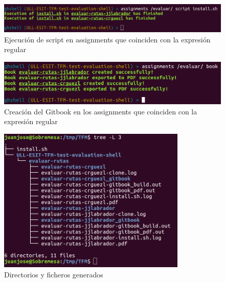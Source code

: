 \begin{itemize}
		\begin{figure}[H]
		\begin{center}
		\includegraphics[width=1\textwidth]{images/assignments1-2}
		\caption{Ejecución de script en assignments que coinciden con la expresión regular}
		\label{fig:assignment1-2}
		\end{center}
		\end{figure}
		
		\begin{figure}[H]
		\begin{center}
		\includegraphics[width=1\textwidth]{images/assignments1-3}
		\caption{Creación del Gitbook en los assignments que coinciden con la expresión regular}
		\label{fig:assignment1-3}
		\end{center}
		\end{figure}
		
		\begin{figure}[H]
		\begin{center}
		\includegraphics[width=0.8\textwidth]{images/assignments1-4}
		\caption{Directorios y ficheros generados}
		\label{fig:assignment1-4}
		\end{center}
		\end{figure}		
	
\end{itemize}
\newpage

